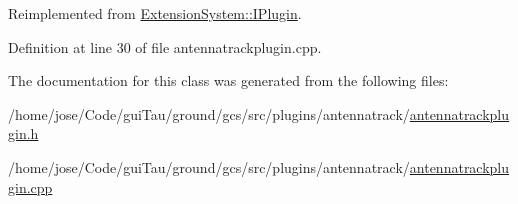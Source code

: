 Reimplemented from \hyperlink{class_extension_system_1_1_i_plugin_a65c16ebd3a6e89918a99af6515fe68cb}{Extension\-System\-::\-I\-Plugin}.



Definition at line 30 of file antennatrackplugin.\-cpp.



The documentation for this class was generated from the following files\-:\begin{DoxyCompactItemize}
\item 
/home/jose/\-Code/gui\-Tau/ground/gcs/src/plugins/antennatrack/\hyperlink{antennatrackplugin_8h}{antennatrackplugin.\-h}\item 
/home/jose/\-Code/gui\-Tau/ground/gcs/src/plugins/antennatrack/\hyperlink{antennatrackplugin_8cpp}{antennatrackplugin.\-cpp}\end{DoxyCompactItemize}
